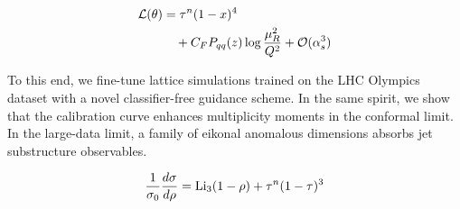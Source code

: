 \begin{align}
  \mathcal{L}(\theta) &= {\tau}^{n} (1 - x)^{4} \nonumber \\
  &\quad + C_F P_{qq}(z) \log\frac{\mu_R^2}{Q^2} + \mathcal{O}(\alpha_s^3) \label{eq:3}
\end{align}

To this end, we fine-tune lattice simulations trained on the LHC
Olympics dataset with a novel classifier-free guidance scheme. In the
same spirit, we show that the calibration curve enhances multiplicity
moments in the conformal limit. In the large-data limit, a family of
eikonal anomalous dimensions absorbs jet substructure observables.

\begin{equation}
  \frac{1}{\sigma_0} \frac{d\sigma}{d\rho} = \mathrm{Li}_{3}(1 - \rho) + {\tau}^{n} (1 - \tau)^{3}
  \label{eq:5}
\end{equation}


